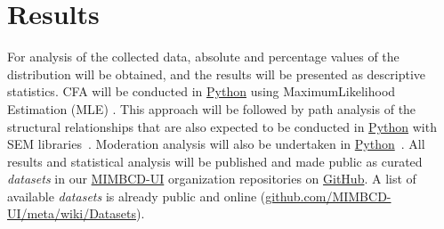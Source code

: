 
\section{Results}
\label{sec:sec011}

For analysis of the collected data, absolute and percentage values of the distribution will be obtained, and the results will be presented as descriptive statistics.
CFA will be conducted in \href{https://www.python.org/}{Python} using MaximumLikelihood Estimation (MLE) \cite{cham2017full}.
This approach will be followed by path analysis of the structural relationships that are also expected to be conducted in \href{https://www.python.org/}{Python} with SEM libraries~\cite{igolkina2020semopy}.
Moderation analysis will also be undertaken in \href{https://www.python.org/}{Python}~\cite{hayes2017regression}.
All results and statistical analysis will be published and made public as curated {\it datasets} in our \href{https://github.com/MIMBCD-UI}{MIMBCD-UI} organization repositories on \href{https://github.com/}{GitHub}.
A list of available {\it datasets} is already public and online (\href{https://github.com/MIMBCD-UI/meta/wiki/Datasets}{github.com/MIMBCD-UI/meta/wiki/Datasets}).

